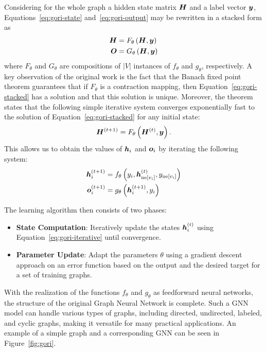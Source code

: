 Considering for the whole graph a hidden state matrix \( \bm{H} \) and a label vector \( \bm{y} \), Equations~\ref{eq:gori-state} and~\ref{eq:gori-output} may be rewritten in a stacked form as
\begin{equation}\label{eq:gori-stacked}
	\begin{split}
		\bm{H} &= F_\theta \left( \bm{H}, \bm{y} \right) \\
		\bm{O} &= G_\theta \left( \bm{H}, \bm{y} \right)
	\end{split}
\end{equation}
where \( F_\theta \) and \( G_\theta \) are compositions of \( \left\lvert V \right\rvert \) instances of \( f_\theta \) and \( g_\theta \), respectively. A key observation of the original work is the fact that the Banach fixed point theorem guarantees that if \( F_\theta \) is a contraction mapping, then Equation~\ref{eq:gori-stacked} has a solution and that this solution is unique. Moreover, the theorem states that the following simple iterative system converges exponentially fast to the solution of Equation~\ref{eq:gori-stacked} for any initial state:
\begin{equation}
	\bm{H}^{(t+1)} = F_\theta \left( \bm{H}^{(t)}, \bm{y} \right).
\end{equation}
This allows us to obtain the values of \( \bm{h}_i \) and \( \bm{o}_i \) by iterating the following system:
\begin{equation}\label{eq:gori-iterative}
	\begin{split}
		\bm{h}_i^{(t+1)} &= f_\theta \left( y_i, \bm{h}_{\mathrm{ne}[v_i]}^{(t)}, y_{\mathrm{ne}[v_i]} \right) \\
		\bm{o}_i^{(t+1)} &= g_\theta \left( \bm{h}_i^{(t+1)}, y_i \right)
	\end{split}
\end{equation}

The learning algorithm then consists of two phases:
\begin{itemize}
	\item \textbf{State Computation}: Iteratively update the states \( \bm{h}_i^{(t)} \) using Equation~\ref{eq:gori-iterative} until convergence.
	\item \textbf{Parameter Update}: Adapt the parameters \( \theta \) using a gradient descent approach on an error function based on the output and the desired target for a set of training graphs.
\end{itemize}
With the realization of the functions \( f_\theta \) and \( g_\theta \) as feedforward neural networks, the structure of the original Graph Neural Network is complete. Such a GNN model can handle various types of graphs, including directed, undirected, labeled, and cyclic graphs, making it versatile for many practical applications. An example of a simple graph and a corresponding GNN can be seen in Figure~\ref{fig:gori}.

